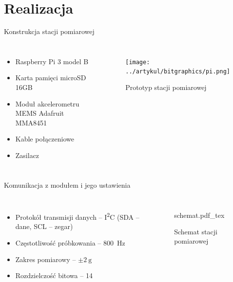 \documentclass[aspectratio=1610,polish]{beamer} %
\begin{document}
  \section{Realizacja}
  \begin{frame}{Konstrukcja stacji pomiarowej}
    \begin{columns}
      \begin{itemize}
	\item Raspberry Pi 3 model B
	\item Karta pamięci microSD 16GB
	\item Moduł akcelerometru MEMS Adafruit MMA8451
	\item Kable połączeniowe
	\item Zasilacz
      \end{itemize}
      \begin{figure}
	\texttt{[image: ../artykul/bitgraphics/pi.png]}
	\caption{Prototyp stacji pomiarowej}
      \end{figure}
    \end{columns}
  \end{frame}
  \begin{frame}{Komunikacja z modułem i jego ustawienia}
    \begin{columns}
      \begin{itemize}
	\item Protokół transmisji danych -- I\textsuperscript{2}C (SDA -- dane,
	  SCL -- zegar)
	\item Częstotliwość próbkowania -- \SI{800}{\hertz}
  \item Zakres pomiarowy -- $\pm\SI{2}{\g}$
  \item Rozdzielczość bitowa -- \SI{14}{\bit}
      \end{itemize}
      \begin{figure}
	{schemat.pdf_tex}
	\caption{Schemat stacji pomiarowej}
      \end{figure}
    \end{columns}
  \end{frame}
\end{document}
